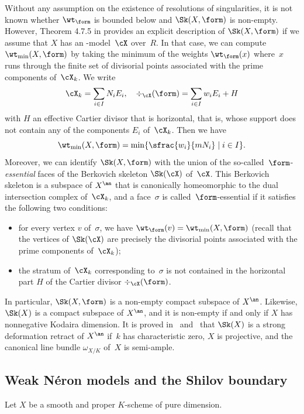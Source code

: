 Without any assumption on the existence of resolutions of singularities, it is not known whether $\wt_{\form}$ is bounded below and $\Sk(X,\form)$ is non-empty.
However, Theorem 4.7.5 in \cite{MuNi} provides an explicit description of $\Sk(X,\form)$ if we assume that $X$ has an \snc-model~$\cX$ over~$R$.
In that case, we can compute $\wt_{\min}(X,\form)$ by taking the minimum of the weights $\wt_{\form}(x)$ where~$x$ runs through the finite set of divisorial points associated with the prime components of~$\cX_k$. We write
\[
\cX_k=\sum_{i\in I}N_i E_i, \quad \div_{\cX}(\form)=\sum_{i\in I}w_i E_i + H
\]
with $H$ an effective Cartier divisor that is horizontal, that is, whose support does not contain any of the components $E_i$ of~$\cX_k$. Then we have
\[
\wt_{\min}(X,\form)=\min \{\sfrac{w_i}{mN_i}\mid i\in I\}.
\]
Moreover, we can identify $\Sk(X,\form)$ with the union of the so-called~$\form$-{\em essential} faces of the Berkovich skeleton $\Sk(\cX)$ of~$\cX$.
This Berkovich skeleton is a subspace of $X^{\an}$ that is canonically homeomorphic to the dual intersection complex of~$\cX_k$, and a face~$\sigma$ is called~$\form$-essential if it satisfies the following two conditions:
\begin{itemize}
\item for every vertex $v$ of~$\sigma$, we have $\wt_{\form}(v)=\wt_{\min}(X,\form)$ (recall that the vertices of $\Sk(\cX)$ are precisely the divisorial points associated with the prime components of~$\cX_k$);

\item the stratum of~$\cX_k$ corresponding to~$\sigma$ is not contained in the horizontal part $H$ of the Cartier divisor $\div_{\cX}(\form)$.
\end{itemize}
In particular, $\Sk(X,\form)$ is a non-empty compact subspace of $X^{\an}$. Likewise, $\Sk(X)$ is a compact subspace of $X^{\an}$, and it is non-empty if and only if $X$ has nonnegative Kodaira dimension.
It is proved in~\cite[3.3.5]{NiXu} and~\cite[Th.\,24]{KNX} that $\Sk(X)$ is a strong deformation retract of $X^{\an}$ if~$k$ has characteristic zero, $X$ is projective, and the canonical line bundle $\omega_{X/K}$ of~$X$ is semi-ample.

\subsection{Weak Néron models and the Shilov boundary}\label{sec:shilov}
Let $X$ be a smooth and proper $K$\nobreakdash-scheme of pure dimension.

